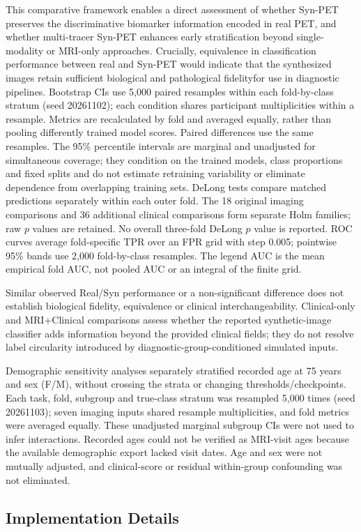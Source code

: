 \documentclass{article}
\providecommand{\DIFaddtex}[1]{{\protect\color{blue} \sf #1}} %
\providecommand{\DIFdeltex}[1]{{\protect\color{red} \scriptsize #1}} %
\providecommand{\DIFaddbegin}{} %
\providecommand{\DIFaddend}{} %
\providecommand{\DIFdelbegin}{} %
\providecommand{\DIFdelend}{} %
\providecommand{\DIFadd}[1]{\texorpdfstring{\DIFaddtex{#1}}{#1}} %
\providecommand{\DIFdel}[1]{\texorpdfstring{\DIFdeltex{#1}}{}} %
\newcommand{\DIFscaledelfig}{0.5}
\newlength{\DIFdelgraphicswidth} %
\newlength{\DIFdelgraphicsheight} %
\newcommand{\DIFaddincludegraphics}[2][]{{\color{blue}\fbox{\DIFOincludegraphics[#1]{#2}}}} %
\newcommand{\DIFdelincludegraphics}[2][]{%
\sbox{\DIFdelgraphicsbox}{\DIFOincludegraphics[#1]{#2}}%
\settoboxwidth{\DIFdelgraphicswidth}{\DIFdelgraphicsbox} %
\settoboxtotalheight{\DIFdelgraphicsheight}{\DIFdelgraphicsbox} %
\scalebox{\DIFscaledelfig}{%
\parbox[b]{\DIFdelgraphicswidth}{\usebox{\DIFdelgraphicsbox}\\[-\baselineskip] \rule{\DIFdelgraphicswidth}{0em}}\llap{\resizebox{\DIFdelgraphicswidth}{\DIFdelgraphicsheight}{%
\setlength{\unitlength}{\DIFdelgraphicswidth}%
\begin{picture}(1,1)%
\thicklines\linethickness{2pt} %
{\color[rgb]{1,0,0}\put(0,0){\framebox(1,1){}}}%
{\color[rgb]{1,0,0}\put(0,0){\line( 1,1){1}}}%
{\color[rgb]{1,0,0}\put(0,1){\line(1,-1){1}}}%
\end{picture}%
}\hspace*{3pt}}} %
} %
\DeclareRobustCommand{\DIFaddbegin}{\DIFOaddbegin \let\includegraphics\DIFaddincludegraphics} %
\DeclareRobustCommand{\DIFaddend}{\DIFOaddend \let\includegraphics\DIFOincludegraphics} %
\DeclareRobustCommand{\DIFdelbegin}{\DIFOdelbegin \let\includegraphics\DIFdelincludegraphics} %
\DeclareRobustCommand{\DIFdelend}{\DIFOaddend \let\includegraphics\DIFOincludegraphics} %
\begin{document}
\DIFdelbegin \DIFdel{This comparative framework enables a direct assessment of whether Syn-PET preserves the discriminative biomarker information encoded in real PET, and whether multi-tracer Syn-PET enhances early stratification beyond single-modality or MRI-only approaches. Crucially, equivalence in classification performance between real and Syn-PET would indicate that the synthesized images retain sufficient biological and pathological fidelityfor use in diagnostic pipelines.
}\DIFdelend \DIFaddbegin \DIFadd{Bootstrap CIs use 5,000 paired resamples within each fold-by-class stratum (seed 20261102); each condition shares participant multiplicities within a resample. Metrics are recalculated by fold and averaged equally, rather than pooling differently trained model scores. Paired differences use the same resamples. The 95\% percentile intervals are marginal and unadjusted for simultaneous coverage; they condition on the trained models, class proportions and fixed splits and do not estimate retraining variability or eliminate dependence from overlapping training sets. DeLong tests compare matched predictions separately within each outer fold. The 18 original imaging comparisons and 36 additional clinical comparisons form separate Holm families; raw $p$ values are retained. No overall three-fold DeLong $p$ value is reported. ROC curves average fold-specific TPR over an FPR grid with step 0.005; pointwise 95\% bands use 2,000 fold-by-class resamples. The legend AUC is the mean empirical fold AUC, not pooled AUC or an integral of the finite grid.
}

\DIFadd{Similar observed Real/Syn performance or a non-significant difference does not establish biological fidelity, equivalence or clinical interchangeability. Clinical-only and MRI+Clinical comparisons assess whether the reported synthetic-image classifier adds information beyond the provided clinical fields; they do not resolve label circularity introduced by diagnostic-group-conditioned simulated inputs.
}

\DIFadd{Demographic sensitivity analyses separately stratified recorded age at 75 years and sex (F/M), without crossing the strata or changing thresholds/checkpoints. Each task, fold, subgroup and true-class stratum was resampled 5,000 times (seed 20261103); seven imaging inputs shared resample multiplicities, and fold metrics were averaged equally. These unadjusted marginal subgroup CIs were not used to infer interactions. Recorded ages could not be verified as MRI-visit ages because the available demographic export lacked visit dates. Age and sex were not mutually adjusted, and clinical-score or residual within-group confounding was not eliminated.
}\DIFaddend \subsection{Implementation Details}
\end{document}
